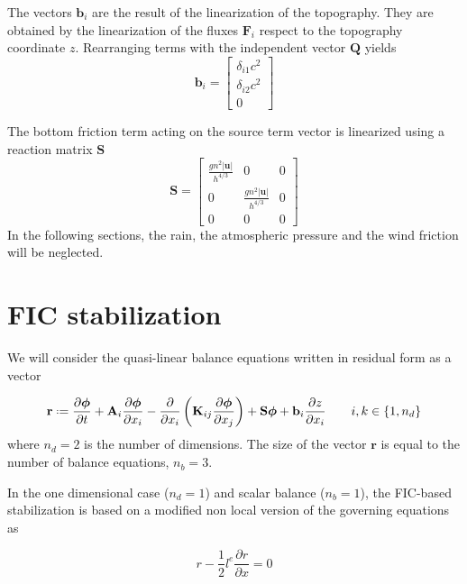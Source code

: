 \documentclass[a4paper,12pt]{elsarticle}
\newcommand{\pder}[2]{\frac{\partial#1}{\partial#2}}
\newcommand{\abs}[1]{\lvert#1\rvert}
\newcommand{\defeq}{\mathrel{\vcenter{\baselineskip0.5ex\lineskiplimit0pt\hbox{\scriptsize.}\hbox{\scriptsize.}}}=}
\begin{document}
The vectors $\mathbf{b}_i$ are the result of the linearization of the topography. They are obtained by the linearization of the fluxes $\mathbf{F}_i$ respect to the topography coordinate $z$. Rearranging terms with the independent vector $\mathbf{Q}$ yields
\begin{equation}
    \mathbf{b}_i = \left[\begin{matrix}
        \delta_{i1} c^2 \\
        \delta_{i2} c^2 \\
        0
    \end{matrix}\right]
\end{equation}


The bottom friction term acting on the source term vector is linearized using a reaction matrix $\mathbf{S}$
\begin{equation}
\mathbf{S} = \left[\begin{matrix}
    \frac{gn^2\abs{\mathbf{u}}}{h^{4/3}} & 0 & 0 \\
    0 & \frac{gn^2\abs{\mathbf{u}}}{h^{4/3}} & 0 \\
    0 & 0 & 0
\end{matrix}\right]
\end{equation}
In the following sections, the rain, the atmospheric pressure and the wind friction will be neglected.



\section{FIC stabilization}
\label{sec:stabilization}

We will consider the quasi-linear balance equations written in residual form as a vector

\begin{equation} \label{residual}
\mathbf{r} \defeq 
  \pder{\bm{\phi}}{t} + \mathbf{A}_i\pder{\bm{\phi}}{x_i}
  -\pder{}{x_i}\left(\mathbf{K}_{ij}\pder{\bm{\phi}}{x_j}\right) + \mathbf{S}\bm{\phi} + \mathbf{b}_i\pder{z}{x_i} \qquad i,k\in\{1,n_d\}
\end{equation}
where $n_d=2$ is the number of dimensions. The size of the vector $\mathbf{r}$ is equal to the number of balance equations, $n_b=3$.

In the one dimensional case ($n_d=1$) and scalar balance ($n_b=1$), the FIC-based stabilization is based on a modified non local version of the governing equations as \cite{onate1998}

\begin{equation}
r - \frac{1}{2}l^e\pder{r}{x} = 0
\end{equation}
\end{document}
